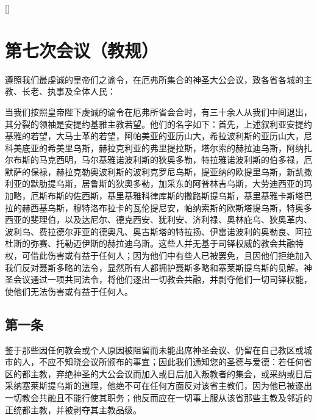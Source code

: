 []\par


\section{第七次会议（教规）}

遵照我们最虔诚的皇帝们之谕令，在厄弗所集合的神圣大公会议，致各省各城的主教、长老、执事及全体人民：\par

当我们按照皇帝陛下虔诚的谕令在厄弗所省会合时，有三十余人从我们中间退出，其分裂的领袖是安提约基雅主教若望。他们的名字如下：首先，上述叙利亚安提约基雅的若望，大马士革的若望，阿帕美亚的亚历山大，希拉波利斯的亚历山大，尼科美底亚的希美里乌斯，赫拉克利亚的弗里提拉斯，塔尔索的赫拉迪乌斯，阿纳扎尔布斯的马克西明，马尔基雅诺波利斯的狄奥多勒，特拉雅诺波利斯的伯多禄，厄默萨的保禄，赫拉克勒奥波利斯的波利克罗尼乌斯，提亚纳的欧提里乌斯，新凯撒利亚的默肋提乌斯，居鲁斯的狄奥多勒，加采东的阿普林吉乌斯，大劳迪西亚的玛加略，厄斯布斯的佐西斯，基里基雅科律库斯的撒路斯提乌斯，基里基雅卡斯塔巴拉的赫西基乌斯，穆特洛布拉卡的瓦伦提尼安，帕纳索斯的欧斯塔提乌斯，特奥多西亚的斐理伯，以及达尼尔、德克西安、犹利安、济利禄、奥林庇乌、狄奥革内、波利乌、费拉德尔菲亚的德奥凡、奥古斯塔的特拉扬、伊雷诺波利的奥勒良、阿拉杜斯的弥赛、托勒迈伊斯的赫拉迪乌斯。这些人并无基于司铎权威的教会共融特权，可借此伤害或有益于任何人；因为他们中有些人已被罢免，且因他们拒绝加入我们反对聂斯多略的法令，显然所有人都拥护聂斯多略和塞莱斯提乌斯的见解。神圣会议通过一项共同法令，将他们逐出一切教会共融，并剥夺他们一切司铎权能，使他们无法伤害或有益于任何人。\par


\subsection{第一条}

鉴于那些因任何教会或个人原因被阻留而未能出席神圣会议、仍留在自己教区或城市的人，不应不知晓会议所颁布的事宜；因此我们通知您的圣德与爱德：若任何省区的都主教，弃绝神圣的大公会议而加入或日后加入叛教者的集会，或采纳或日后采纳塞莱斯提乌斯的道理，他绝不可在任何方面反对该省主教们，因为他已被逐出一切教会共融且不能行使其职务；他反而应在一切事上服从该省那些主教及邻近的正统都主教，并被剥夺其主教品级。\par

